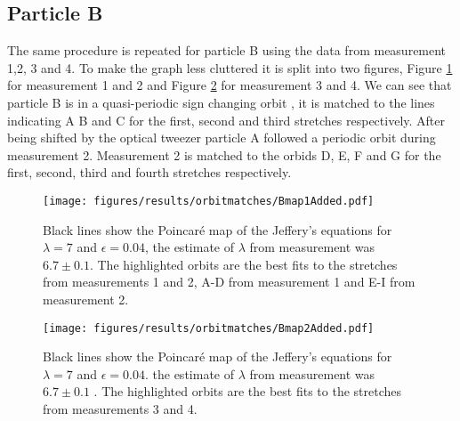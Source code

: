 \subsection{Particle B}

The same procedure is repeated for particle B using the data from measurement 1,2, 3 and 4. To make the graph less cluttered it is split into two figures, Figure \ref{fig:October1Particle4runs2and2Orbits} for measurement 1 and 2 and Figure \ref{fig:October1Particle4_runs3and5Orbits} for measurement 3 and 4. We can see that particle B is in a quasi-periodic sign changing orbit , it is matched to the lines indicating A B and C for the first, second and third stretches respectively.  After being shifted by  the optical tweezer particle A followed a periodic orbit during measurement 2. Measurement 2 is matched to the orbids D, E, F and G for the first, second, third and fourth stretches respectively. 

\begin{figure}[H]
\centering
\texttt{[image: figures/results/orbitmatches/Bmap1Added.pdf]}
\caption{Black lines show the Poincaré map of the Jeffery's equations for $\lambda = 7$ and $\epsilon=0.04$, the estimate of $\lambda$ from measurement was $6.7 \pm 0.1$. The highlighted orbits are the best fits to the stretches from measurements 1 and 2, A-D from measurement 1 and E-I from measurement 2.}
\label{fig:October1Particle4runs2and2Orbits}
\end{figure}


\begin{figure}[H]
\centering
\texttt{[image: figures/results/orbitmatches/Bmap2Added.pdf]}
\caption{Black lines show the Poincaré map of the Jeffery's equations for $\lambda = 7$ and $\epsilon = 0.04$. the estimate of $\lambda$ from measurement was $6.7 \pm 0.1$ . The highlighted orbits are the best fits to the stretches from measurements 3 and 4.}
\label{fig:October1Particle4_runs3and5Orbits}
\end{figure}



